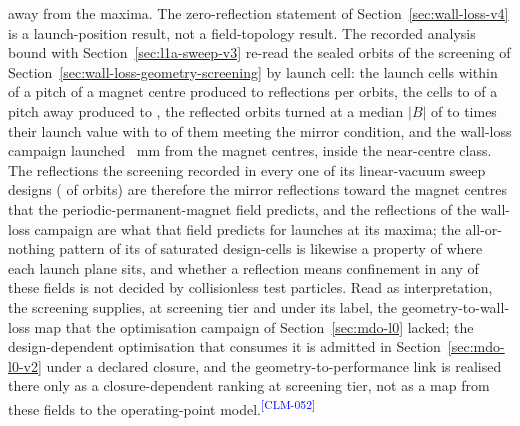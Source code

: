 \documentclass[11pt]{article}
\newcommand{\EvidenceClaim}[2]{#2\textsuperscript{\textcolor{blue}{[#1]}}}
\begin{document}
away from the maxima.
\EvidenceClaim{CLM-052}{The zero-reflection statement of
Section~\ref{sec:wall-loss-v4} is a launch-position result, not a field-topology
result. The recorded analysis bound with Section~\ref{sec:l1a-sweep-v3} re-read
the sealed orbits of the screening of Section~\ref{sec:wall-loss-geometry-screening}
by launch cell: the \SwtPpmNearCells{} launch cells within
\SwtPpmNearCentrePitch{} of a pitch of a magnet centre produced
\SwtPpmNearReflectionsMin{} to \SwtPpmNearReflectionsMax{} reflections per
\SwtPpmOrbitsPerCell{} orbits, the \SwtPpmFarCells{} cells \SwtPpmFarMinPitch{}
to \SwtPpmFarMaxPitch{} of a pitch away produced \SwtPpmFarReflectionsMin{} to
\SwtPpmFarReflectionsMax, the reflected orbits turned at a median $|B|$ of
\SwtPpmBTurnMedianMin{} to \SwtPpmBTurnMedianMax{} times their launch value with
\SwtPpmMirrorConditionMin{} to \SwtPpmMirrorConditionMax{} of them meeting the
mirror condition, and the wall-loss campaign launched \SwtVFourLaunchOffsetMm{}~mm
from the magnet centres, inside the near-centre class. The reflections the
screening recorded in every one of its \WlgDesignsWithReflections{} linear-vacuum
sweep designs (\WlgReflectionShareAll{} of \WlgOrbitCount{} orbits) are therefore
the mirror reflections toward the magnet centres that the periodic-permanent-magnet
field predicts, and the \WlfPooledReflected{} reflections of the wall-loss
campaign are what that field predicts for launches at its maxima; the
all-or-nothing pattern of its \WlgCellsSaturatedOne{} of \WlgDesignCells{}
saturated design-cells is likewise a property of where each launch plane sits,
and whether a reflection means confinement in any of these fields is not decided
by collisionless test particles. Read as interpretation, the screening supplies,
at screening tier and under its label, the geometry-to-wall-loss map that the
optimisation campaign of Section~\ref{sec:mdo-l0} lacked; the design-dependent
optimisation that consumes it is admitted in Section~\ref{sec:mdo-l0-v2} under a
declared closure, and the geometry-to-performance link is realised there only as
a closure-dependent ranking at screening tier, not as a map from these fields to
the operating-point model.}
\end{document}
